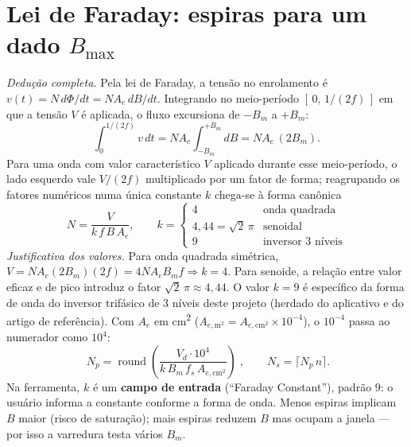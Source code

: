 \documentclass[
	a4paper, 12pt,
	chapter=TITLE, section=Title, subsection=Title,
	oneside, english, brazil, fleqn
]{abntex2}
\begin{document}
\section{Lei de Faraday: espiras para um dado \texorpdfstring{$B_{\max}$}{Bmax}}
\textit{Dedução completa.} Pela lei de Faraday, a tensão no enrolamento é
$v(t)=N\,d\Phi/dt=N A_e\,dB/dt$. Integrando no meio-período $[\,0,\,1/(2f)\,]$ em
que a tensão $V$ é aplicada, o fluxo excursiona de $-B_m$ a $+B_m$:
\begin{equation}
	\int_0^{1/(2f)}\! v\,dt = N A_e\!\int_{-B_m}^{+B_m}\! dB = N A_e\,(2B_m).
	\label{eq:vs}
\end{equation}
Para uma onda com valor característico $V$ aplicado durante esse meio-período, o
lado esquerdo vale $V/(2f)$ multiplicado por um fator de forma; reagrupando os
fatores numéricos numa única constante $k$ chega-se à forma canônica
\begin{equation}
	N=\frac{V}{k\,f\,B\,A_e},\qquad
	k=\begin{cases}4 & \text{onda quadrada}\\ 4{,}44=\sqrt2\,\pi & \text{senoidal}\\ 9 & \text{inversor 3 níveis}\end{cases}
	\label{eq:Ngeral}
\end{equation}
\textit{Justificativa dos valores.} Para onda quadrada simétrica,
$V=N A_e(2B_m)(2f)=4NA_eB_mf\Rightarrow k=4$. Para senoide, a relação entre valor
eficaz e de pico introduz o fator $\sqrt2\,\pi\approx4{,}44$. O valor $k=9$ é
específico da forma de onda do inversor trifásico de 3 níveis deste projeto
(herdado do aplicativo e do artigo de referência). Com $A_e$ em
\si{\square\centi\meter} ($A_{e,\mathrm{m^2}}=A_{e,\mathrm{cm^2}}\times10^{-4}$), o
$10^{-4}$ passa ao numerador como $10^{4}$:
\begin{equation}
	\boxed{\;N_p=\operatorname{round}\!\left(\frac{V_d\cdot10^{4}}{k\,B_m\,f_s\,A_{e,\mathrm{cm^2}}}\right)\;},
	\qquad N_s=\lceil N_p\,n\rceil.
	\label{eq:Np}
\end{equation}
Na ferramenta, $k$ é um \textbf{campo de entrada} (``Faraday Constant''), padrão
$9$: o usuário informa a constante conforme a forma de onda. Menos espiras
implicam $B$ maior (risco de saturação); mais espiras reduzem $B$ mas ocupam a
janela --- por isso a varredura testa vários $B_m$.
\end{document}
